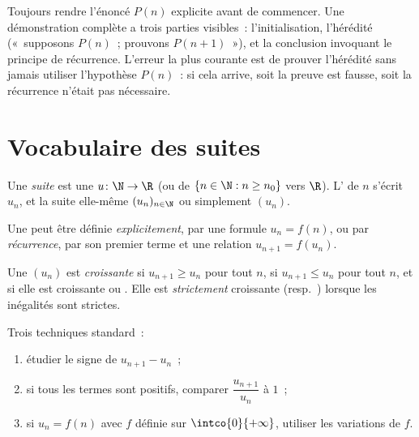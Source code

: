 \begin{method}\label{met:g12:seq:induction}
Toujours rendre l'énoncé $P(n)$ explicite avant de commencer. Une
démonstration complète a trois parties visibles~: l'initialisation,
l'hérédité («~supposons $P(n)$~; prouvons $P(n+1)$~»), et la conclusion
invoquant le principe de récurrence. L'erreur la plus courante est de
prouver l'hérédité sans jamais utiliser l'hypothèse $P(n)$~: si cela
arrive, soit la preuve est fausse, soit la récurrence n'était pas
nécessaire.
\end{method}

\section{Vocabulaire des suites}

\begin{definition}[Suite]\label{def:g12:seq:sequence}
Une \emph{suite} est une  $u \colon \N \to \R$ (ou
de $\{n \in \N : n \geq n_0\}$ vers $\R$). L' de $n$ s'écrit $u_n$,
et la suite elle-même $(u_n)_{n\in\N}$ ou simplement $(u_n)$.
\end{definition}

Une  peut être définie \emph{explicitement}, par une formule
$u_n = f(n)$, ou par \emph{récurrence}, par son premier terme et une
relation $u_{n+1} = f(u_n)$.

\begin{definition}[Monotonie]\label{def:g12:seq:monotonic}
Une  $(u_n)$ est \emph{croissante} si
$u_{n+1} \geq u_n$ pour tout $n$, \emph{} si
$u_{n+1} \leq u_n$ pour tout $n$, et \emph{} si elle est
croissante ou . Elle est \emph{strictement} croissante
(resp.\ ) lorsque les inégalités sont strictes.
\end{definition}

\begin{method}\label{met:g12:seq:monotonicity}
Trois techniques standard~:
\begin{enumerate}
  \item étudier le signe de $u_{n+1} - u_n$~;
  \item si tous les termes sont positifs, comparer $\dfrac{u_{n+1}}{u_n}$
        à $1$~;
  \item si $u_n = f(n)$ avec $f$ définie sur $\intco{0}{+\infty}$, utiliser
        les variations de $f$.
\end{enumerate}
\end{method}

